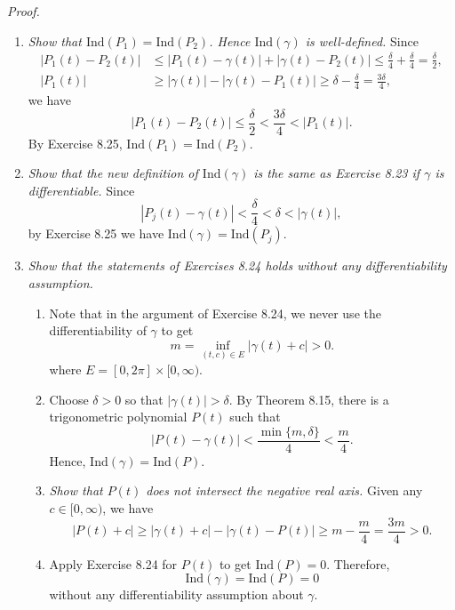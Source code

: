 \documentclass{article}
\begin{document}
\emph{Proof.}
\begin{enumerate}
\item[(1)]
\emph{Show that $\mathrm{Ind}(P_1) = \mathrm{Ind}(P_2)$.
Hence $\mathrm{Ind}(\gamma)$ is well-defined.}
Since
\begin{align*}
  |P_1(t) - P_2(t)|
  &\leq |P_1(t) - \gamma(t)| + |\gamma(t) - P_2(t)|
  \leq \frac{\delta}{4} + \frac{\delta}{4}
  = \frac{\delta}{2}, \\
  |P_1(t)|
  &\geq |\gamma(t)| - |\gamma(t) - P_1(t)|
  \geq \delta - \frac{\delta}{4}
  = \frac{3\delta}{4},
\end{align*}
we have
\[
  |P_1(t) - P_2(t)| \leq \frac{\delta}{2} < \frac{3\delta}{4} < |P_1(t)|.
\]
By Exercise 8.25, $\mathrm{Ind}(P_1) = \mathrm{Ind}(P_2)$.

\item[(2)]
\emph{Show that the new definition of $\mathrm{Ind}(\gamma)$
is the same as Exercise 8.23 if $\gamma$ is differentiable.}
Since
\[
  |P_j(t)-\gamma(t)|
  < \frac{\delta}{4}
  < \delta
  < |\gamma(t)|,
\]
by Exercise 8.25 we have $\mathrm{Ind}(\gamma) = \mathrm{Ind}(P_j)$.

\item[(3)]
\emph{Show that the statements of Exercises 8.24 holds
without any differentiability assumption.}
  \begin{enumerate}
  \item[(a)]
    Note that in the argument of Exercise 8.24,
    we never use the differentiability of $\gamma$ to get
    \[
      m = \inf_{(t,c) \in E} |\gamma(t)+c| > 0.
    \]
    where $E = [0,2\pi] \times [0,\infty)$.

  \item[(b)]
  Choose $\delta > 0$ so that $|\gamma(t)| > \delta$.
  By Theorem 8.15, there is a trigonometric polynomial $P(t)$ such that
  \[
    |P(t) - \gamma(t)| < \frac{\min\{m, \delta\}}{4} < \frac{m}{4}.
  \]
  Hence, $\mathrm{Ind}(\gamma) = \mathrm{Ind}(P)$.

  \item[(c)]
  \emph{Show that $P(t)$ does not intersect the negative real axis.}
  Given any $c \in [0,\infty)$, we have
  \[
    |P(t)+c|
    \geq |\gamma(t)+c| - |\gamma(t)-P(t)|
    \geq m - \frac{m}{4}
    = \frac{3m}{4}
    > 0.
  \]

  \item[(d)]
  Apply Exercise 8.24 for $P(t)$ to get $\mathrm{Ind}(P) = 0$.
  Therefore,
  \[
    \mathrm{Ind}(\gamma) = \mathrm{Ind}(P) = 0
  \]
  without any differentiability assumption about $\gamma$.
  \end{enumerate}


\end{enumerate}
\end{document}
